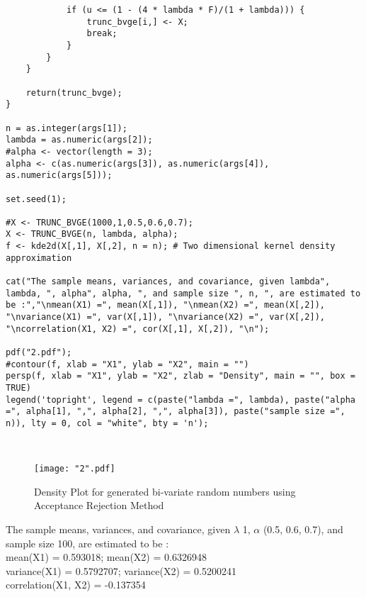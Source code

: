 \documentclass[11pt]{article}
\begin{document}
\begin{enumerate}
\begin{lstlisting}
			if (u <= (1 - (4 * lambda * F)/(1 + lambda))) {
				trunc_bvge[i,] <- X;
				break;
			}
		}
	}

	return(trunc_bvge);
}  

n = as.integer(args[1]);
lambda = as.numeric(args[2]);
#alpha <- vector(length = 3);
alpha <- c(as.numeric(args[3]), as.numeric(args[4]), as.numeric(args[5]));

set.seed(1);

#X <- TRUNC_BVGE(1000,1,0.5,0.6,0.7);
X <- TRUNC_BVGE(n, lambda, alpha);
f <- kde2d(X[,1], X[,2], n = n); # Two dimensional kernel density approximation

cat("The sample means, variances, and covariance, given lambda", lambda, ", alpha", alpha, ", and sample size ", n, ", are estimated to be :","\nmean(X1) =", mean(X[,1]), "\nmean(X2) =", mean(X[,2]), "\nvariance(X1) =", var(X[,1]), "\nvariance(X2) =", var(X[,2]), "\ncorrelation(X1, X2) =", cor(X[,1], X[,2]), "\n");

pdf("2.pdf");
#contour(f, xlab = "X1", ylab = "X2", main = "")
persp(f, xlab = "X1", ylab = "X2", zlab = "Density", main = "", box = TRUE)
legend('topright', legend = c(paste("lambda =", lambda), paste("alpha =", alpha[1], ",", alpha[2], ",", alpha[3]), paste("sample size =", n)), lty = 0, col = "white", bty = 'n');
\end{lstlisting}

\\
\begin{figure}[H]
	\centering
	\texttt{[image: "2".pdf]}
		\caption{Density Plot for generated bi-variate random numbers using Acceptance Rejection Method}
\end{figure}

The sample means, variances, and covariance, given $\lambda$ 1, $\alpha$ (0.5, 0.6, 0.7), and sample size 100, are estimated to be :\\ 
mean(X1) = 0.593018; \hspace{10mm}
mean(X2) = 0.6326948\\
variance(X1) = 0.5792707; \hspace{10mm}
variance(X2) = 0.5200241\\
correlation(X1, X2) = -0.137354

\end{enumerate}
\end{document}
